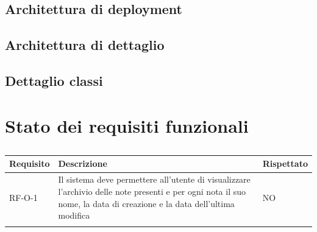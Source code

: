 \documentclass[a4paper,10pt]{article}
\begin{document}
\subsection{Architettura di deployment}

\subsection{Architettura di dettaglio}

\subsection{Dettaglio classi}

\newpage

\section{Stato dei requisiti funzionali}
\begin{center}
    \begin{longtable}{|>{\centering\arraybackslash}m{2.5cm}|>{\centering\arraybackslash}m{8cm}|>{\centering\arraybackslash}m{2.5cm}|}
        \hline
        \textbf{Requisito} & \textbf{Descrizione} & \textbf{Rispettato} \\ \hline
        \endfirsthead
        \hline
        RF-O-1 & Il sistema deve permettere all’utente di visualizzare l’archivio delle note presenti e per ogni nota il suo nome, la data di creazione e la data dell’ultima modifica & NO \\ \hline
        \caption{}
    \end{longtable}
\end{center}
\end{document}
